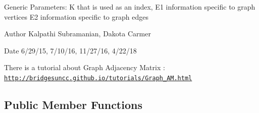 Generic Parameters\+: K that is used as an index, E1 information specific to graph vertices E2 information specific to graph edges

\begin{DoxyAuthor}{Author}
Kalpathi Subramanian, Dakota Carmer 
\end{DoxyAuthor}
\begin{DoxyDate}{Date}
6/29/15, 7/10/16, 11/27/16, 4/22/18
\end{DoxyDate}
There is a tutorial about Graph Adjacency Matrix \+: \href{http://bridgesuncc.github.io/tutorials/Graph_AM.html}{\tt http\+://bridgesuncc.\+github.\+io/tutorials/\+Graph\+\_\+\+A\+M.\+html} \subsection*{Public Member Functions}
